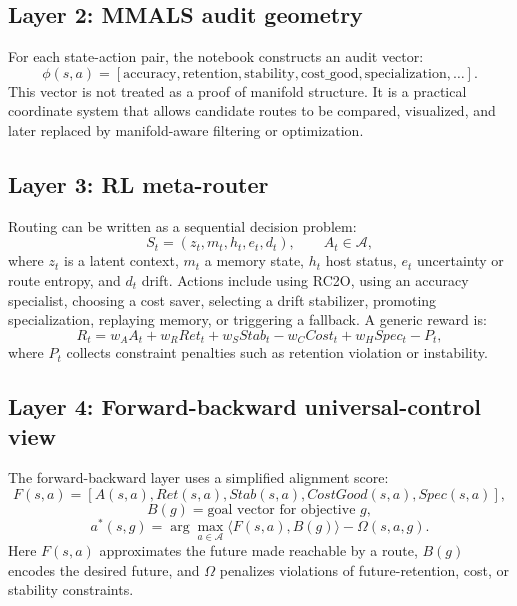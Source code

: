 \documentclass[11pt,a4paper]{article}
\begin{document}
\subsection{Layer 2: MMALS audit geometry}
For each state-action pair, the notebook constructs an audit vector:
\begin{equation}
\phi(s,a) = [\mathrm{accuracy},\mathrm{retention},\mathrm{stability},\mathrm{cost\_good},\mathrm{specialization},\ldots].
\end{equation}
This vector is not treated as a proof of manifold structure. It is a practical coordinate system that allows candidate routes to be compared, visualized, and later replaced by manifold-aware filtering or optimization.

\subsection{Layer 3: RL meta-router}
Routing can be written as a sequential decision problem:
\begin{equation}
S_t = (z_t,m_t,h_t,e_t,d_t), \qquad A_t \in \mathcal{A},
\end{equation}
where $z_t$ is a latent context, $m_t$ a memory state, $h_t$ host status, $e_t$ uncertainty or route entropy, and $d_t$ drift. Actions include using RC2O, using an accuracy specialist, choosing a cost saver, selecting a drift stabilizer, promoting specialization, replaying memory, or triggering a fallback. A generic reward is:
\begin{equation}
R_t = w_A A_t + w_R Ret_t + w_S Stab_t - w_C Cost_t + w_H Spec_t - P_t,
\end{equation}
where $P_t$ collects constraint penalties such as retention violation or instability.

\subsection{Layer 4: Forward-backward universal-control view}
The forward-backward layer uses a simplified alignment score:
\begin{equation}
F(s,a) = [A(s,a), Ret(s,a), Stab(s,a), CostGood(s,a), Spec(s,a)],
\end{equation}
\begin{equation}
B(g) = \text{goal vector for objective }g,
\end{equation}
\begin{equation}
 a^*(s,g) = \arg\max_{a\in\mathcal{A}} \langle F(s,a), B(g) \rangle - \Omega(s,a,g).
 \label{eq:fbscore}
\end{equation}
Here $F(s,a)$ approximates the future made reachable by a route, $B(g)$ encodes the desired future, and $\Omega$ penalizes violations of future-retention, cost, or stability constraints.
\end{document}
